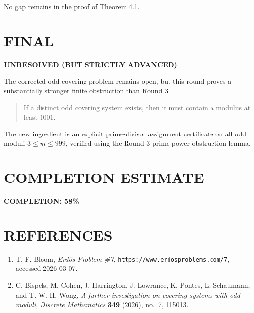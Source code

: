 No gap remains in the proof of Theorem 4.1.

\section{FINAL}

\textbf{UNRESOLVED (BUT STRICTLY ADVANCED)}

The corrected odd-covering problem remains open, but this round proves a substantially stronger finite obstruction than Round 3:

\begin{quote}
If a distinct odd covering system exists, then it must contain a modulus at least \(1001\).
\end{quote}

The new ingredient is an explicit prime-divisor assignment certificate on all odd moduli \(3\le m\le 999\), verified using the Round-3 prime-power obstruction lemma.

\section{COMPLETION ESTIMATE}

\textbf{COMPLETION: 58\%}

\section{REFERENCES}

\begin{enumerate}
\item T. F. Bloom, \emph{Erd\H{o}s Problem \#7}, \texttt{https://www.erdosproblems.com/7}, accessed 2026-03-07.
\item C. Bispels, M. Cohen, J. Harrington, J. Lowrance, K. Pontes, L. Schaumann, and T. W. H. Wong, \emph{A further investigation on covering systems with odd moduli}, \emph{Discrete Mathematics} \textbf{349} (2026), no.~7, 115013.
\end{enumerate}

